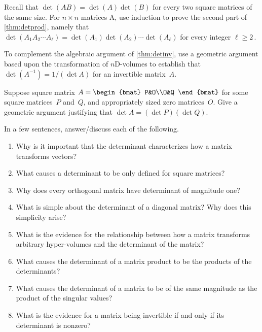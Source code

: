 \begin{exercise} \label{ex:detprodk} 
Recall that \(\det(AB)=\det(A)\det(B)\) for every two square matrices of the same size.
For \(n\times n\) matrices \hlist A\ell, use induction to prove the second part of \cref{thm:detprod}, namely that \(\det(A_1A_2\cdots A_\ell)=\det(A_1)\det(A_2)\cdots\det(A_\ell)\) for every integer \(\ell\geq2\)\,.
\end{exercise}






\begin{exercise}  
To complement the algebraic argument of \cref{thm:detinv}, use a geometric argument based upon the transformation of \(n\)D-volumes to establish that \(\det(A^{-1})=1/(\det A)\) for an invertible matrix~\(A\).
\end{exercise}




\begin{exercise}  
Suppose square matrix \(A=\begin{bmat} P&O\\O&Q \end{bmat}\) for some square matrices~\(P\) and~\(Q\), and appropriately sized zero matrices~\(O\).
Give a geometric argument justifying that \(\det A=(\det P)(\det Q)\).
\end{exercise}




\begin{exercise} 
In a few sentences, answer\slash discuss each of the following.
\begin{enumerate}
\item  Why is it important that the determinant characterizes how a matrix transforms vectors?

\item What causes a determinant to be only defined for square matrices?

\item Why does every orthogonal matrix have determinant of magnitude one?

\item What is simple about the determinant of a diagonal matrix?  Why does this simplicity arise?

\item What is the evidence for the relationship between how a matrix transforms arbitrary hyper-volumes and the determinant of the matrix?

\item What causes the determinant of a matrix product to be the products of the determinants?

\item What causes the determinant of a matrix to be of the same magnitude as the product of the singular values?

\item What is the evidence for a matrix being invertible if and only if its determinant is nonzero?

\end{enumerate}
\end{exercise}


\begin{comment}%
why, what caused X?
how did X occur?
what-if? what-if-not?
how does X compare with Y?
what is the evidence for X?
why is X important?
\end{comment}



